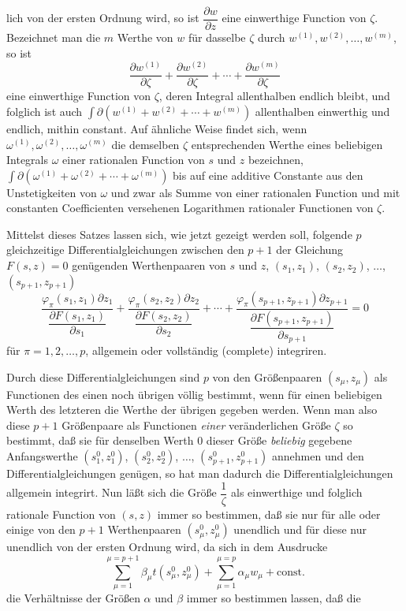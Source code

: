 \documentclass{article}
\begin{document}
lich von der ersten Ordnung wird, so ist $\dfrac{\partial w}{\partial z}$ eine einwerthige Function von $\zeta$. Bezeichnet man die $m$ Werthe von $w$ für dasselbe $\zeta$ durch $w^{(1)}, w^{(2)}, \ldots, w^{(m)}$, so ist
\[ \frac{\partial w^{(1)}}{\partial\zeta} + \frac{\partial w^{(2)}}{\partial\zeta} + \cdots + \frac{\partial w^{(m)}}{\partial\zeta} \]
eine einwerthige Function von $\zeta$, deren Integral allenthalben endlich bleibt, und folglich ist auch $\displaystyle\int \partial (w^{(1)} + w^{(2)} + \cdots + w^{(m)})$ allenthalben einwerthig und endlich, mithin constant. Auf ähnliche Weise findet sich, wenn $\omega^{(1)}, \omega^{(2)}, \ldots, \omega^{(m)}$ die demselben $\zeta$ entsprechenden Werthe eines beliebigen Integrals $\omega$ einer rationalen Function von $s$ und $z$ bezeichnen, $\displaystyle\int \partial (\omega^{(1)} + \omega^{(2)} + \cdots + \omega^{(m)})$ bis auf eine additive Constante aus den Unstetigkeiten von $\omega$ und zwar als Summe von einer rationalen Function und mit constanten Coefficienten versehenen Logarithmen rationaler Functionen von $\zeta$.

Mittelst dieses Satzes lassen sich, wie jetzt gezeigt werden soll, folgende $p$ gleichzeitige Differentialgleichungen zwischen den $p+1$ der Gleichung $F(s, z) = 0$ genügenden Werthenpaaren von $s$ und $z$, $(s_{1}, z_{1})$, $(s_{2}, z_{2})$, $\ldots$, $(s_{p+1}, z_{p+1})$
\[ \frac{\varphi_{\pi}(s_{1}, z_{1}) \partial z_{1}}{\dfrac{\partial F(s_{1}, z_{1})}{\partial s_{1}}} + \frac{\varphi_{\pi}(s_{2}, z_{2}) \partial z_{2}}{\dfrac{\partial F(s_{2}, z_{2})}{\partial s_{2}}} + \cdots + \frac{\varphi_{\pi}(s_{p+1}, z_{p+1}) \partial z_{p+1}}{\dfrac{\partial F(s_{p+1}, z_{p+1})}{\partial s_{p+1}}} = 0 \]
für $\pi = 1, 2, \ldots, p$, allgemein oder vollständig (complete) integriren.

Durch diese Differentialgleichungen sind $p$ von den Größenpaaren $(s_{\mu}, z_{\mu})$ als Functionen des einen noch übrigen völlig bestimmt, wenn für einen beliebigen Werth des letzteren die Werthe der übrigen gegeben werden. Wenn man also diese $p+1$ Größenpaare als Functionen \emph{einer} veränderlichen Größe $\zeta$ so bestimmt, daß sie für denselben Werth 0 dieser Größe \emph{beliebig} gegebene Anfangswerthe $(s_{1}^{0}, z_{1}^{0})$, $(s_{2}^{0}, z_{2}^{0})$, $\ldots$, $(s_{p+1}^{0}, z_{p+1}^{0})$ annehmen und den Differentialgleichungen genügen, so hat man dadurch die Differentialgleichungen allgemein integrirt. Nun läßt sich die Größe $\dfrac{1}{\zeta}$ als einwerthige und folglich rationale Function von $(s, z)$ immer so bestimmen, daß sie nur für alle oder einige von den $p+1$ Werthenpaaren $(s_{\mu}^{0}, z_{\mu}^{0})$ unendlich und für diese nur unendlich von der ersten Ordnung wird, da sich in dem Ausdrucke
\[ \sum_{\mu=1}^{\mu=p+1} \beta_{\mu} t(s_{\mu}^{0}, z_{\mu}^{0}) + \sum_{\mu=1}^{\mu=p} \alpha_{\mu} w_{\mu} + \text{const.} \]
die Verhältnisse der Größen $\alpha$ und $\beta$ immer so bestimmen lassen, daß die
\end{document}

